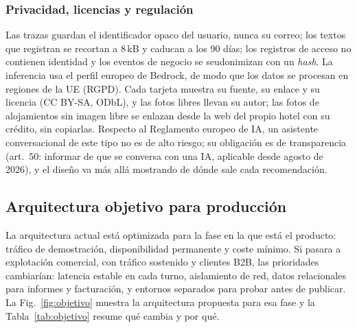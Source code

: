 \subsubsection{Privacidad, licencias y regulación} Las trazas guardan el identificador opaco del
usuario, nunca su correo; los textos que registran se recortan a 8\,kB y caducan a los 90 días; los registros de acceso
no contienen identidad y los eventos de negocio se seudonimizan con un \emph{hash}. La inferencia
usa el perfil europeo de Bedrock, de modo que los datos se procesan en regiones de la UE (RGPD).
Cada tarjeta muestra su fuente, su enlace y su licencia (CC BY-SA, ODbL), y las fotos libres
llevan su autor; las fotos de alojamientos sin imagen libre se enlazan desde la web del propio
hotel con su crédito, sin copiarlas. Respecto al Reglamento europeo de IA, un asistente
conversacional de este tipo no es de alto riesgo; su obligación es de transparencia (art.~50:
informar de que se conversa con una IA, aplicable desde agosto de 2026), y el diseño va más allá
mostrando de dónde sale cada recomendación.

\subsection{Arquitectura objetivo para producción}\label{sec:prod}

La arquitectura actual está optimizada para la fase en la que está el producto: tráfico de
demostración, disponibilidad permanente y coste mínimo. Si \kyrian{} pasara a explotación
comercial, con tráfico sostenido y clientes B2B, las prioridades cambiarían: latencia estable en
cada turno, aislamiento de red, datos relacionales para informes y facturación, y entornos
separados para probar antes de publicar. La Fig.~\ref{fig:objetivo} muestra la arquitectura
propuesta para esa fase y la Tabla~\ref{tab:objetivo} resume qué cambia y por qué.

